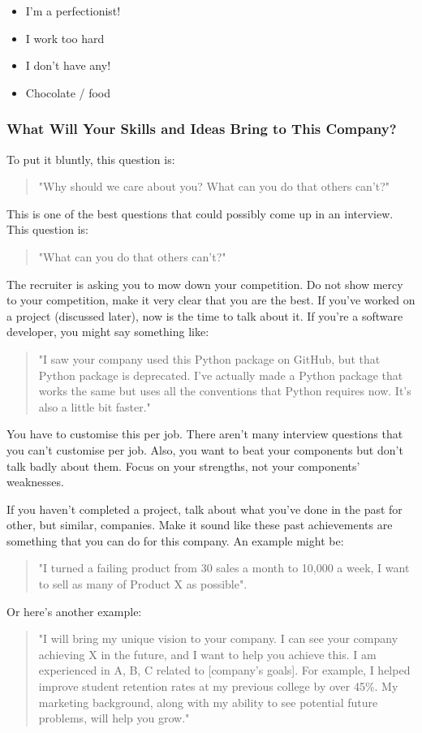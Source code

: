 \documentclass{article}
\begin{document}
\begin{itemize}
\item
  I'm a perfectionist!
\item
  I work too hard
\item
  I don't have any!
\item
  Chocolate / food
\end{itemize}
\subsubsection{What Will Your Skills and Ideas Bring to This Company?}
To put it bluntly, this question is:
\begin{quote}
    "Why should we care about you? What can you do that others can't?"
\end{quote}
This is one of the best questions that could possibly come up in an
interview. This question is:

\begin{quote}
    "What can you do that others can't?"
\end{quote}
The recruiter is asking you to mow down your competition. Do not show
mercy to your competition, make it very clear that you are the best. If
you've worked on a project (discussed later), now is the time to talk
about it. If you're a software developer, you might say something like:

\begin{quote}
    "I saw your company used this Python package on GitHub, but that Python
package is deprecated. I've actually made a Python package that works
the same but uses all the conventions that Python requires now. It's
also a little bit faster."
\end{quote}
You have to customise this per job. There aren't many interview
questions that you can't customise per job. Also, you want to beat your
components but don't talk badly about them. Focus on your strengths, not
your components' weaknesses.

If you haven't completed a project, talk about what you've done in the
past for other, but similar, companies. Make it sound like these past
achievements are something that you can do for this company. An example
might be:
\begin{quote}
    "I turned a failing product from 30 sales a month to 10,000 a week, I
want to sell as many of Product X as possible".
\end{quote}
Or here's another example:
\begin{quote}
    "I will bring my unique vision to your company. I can see your company
achieving X in the future, and I want to help you achieve this. I am
experienced in A, B, C related to {[}company's goals{]}. For example, I
helped improve student retention rates at my previous college by over
45\%. My marketing background, along with my ability to see potential
future problems, will help you grow."
\end{quote}
\end{document}
